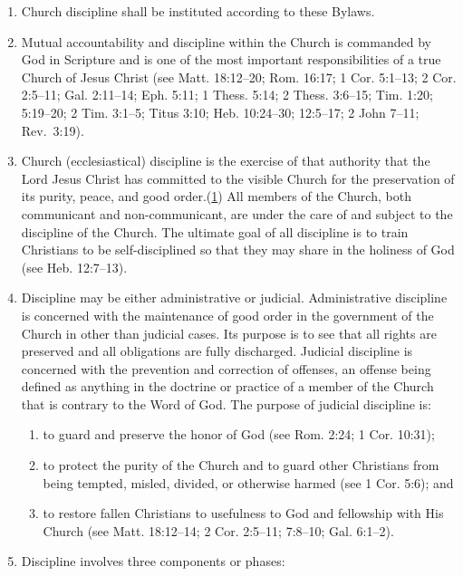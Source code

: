 \documentclass[
]{book}
\providecommand{\tightlist}{%
  \setlength{\itemsep}{0pt}\setlength{\parskip}{0pt}}
\begin{document}
\begin{enumerate}
\def\labelenumi{\arabic{enumi}.}
\item
  Church discipline shall be instituted according to these Bylaws.
\item
  Mutual accountability and discipline within the Church is commanded by God in Scripture and is one of the most important responsibilities of a true Church of Jesus Christ (see Matt. 18:12--20; Rom. 16:17; 1 Cor. 5:1--13; 2 Cor. 2:5--11; Gal. 2:11--14; Eph. 5:11; 1 Thess. 5:14; 2 Thess. 3:6--15; Tim. 1:20; 5:19--20; 2 Tim. 3:1--5; Titus 3:10; Heb. 10:24--30; 12:5--17; 2 John 7--11; Rev.~3:19).
\item
  Church (ecclesiastical) discipline is the exercise of that authority that the Lord Jesus Christ has committed to the visible Church for the preservation of its purity, peace, and good order.(\protect\hyperlink{excerpt-from-biblical-church-discipline-by-daniel-e.-wray}{1}) All members of the Church, both communicant and non-communicant, are under the care of and subject to the discipline of the Church. The ultimate goal of all discipline is to train Christians to be self-disciplined so that they may share in the holiness of God (see Heb. 12:7--13).
\item
  Discipline may be either administrative or judicial. Administrative discipline is concerned with the maintenance of good order in the government of the Church in other than judicial cases. Its purpose is to see that all rights are preserved and all obligations are fully discharged. Judicial discipline is concerned with the prevention and correction of offenses, an offense being defined as anything in the doctrine or practice of a member of the Church that is contrary to the Word of God. The purpose of judicial discipline is:

  \begin{enumerate}
  \def\labelenumii{\alph{enumii}.}
  \tightlist
  \item
    to guard and preserve the honor of God (see Rom. 2:24; 1 Cor. 10:31);
  \item
    to protect the purity of the Church and to guard other Christians from being tempted, misled, divided, or otherwise harmed (see 1 Cor. 5:6); and
  \item
    to restore fallen Christians to usefulness to God and fellowship with His Church (see Matt. 18:12--14; 2 Cor. 2:5--11; 7:8--10; Gal. 6:1--2).
  \end{enumerate}
\item
  Discipline involves three components or phases:


\end{enumerate}
\end{document}
